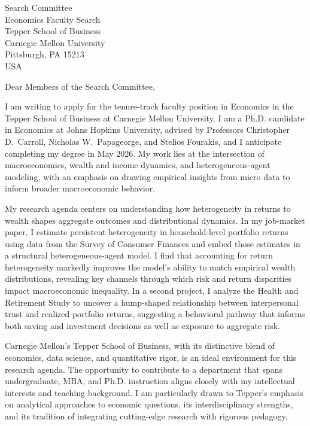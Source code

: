 \documentclass[11pt,letterpaper]{letter}
\begin{document}
\begin{letter}{Search Committee \\
Economics Faculty Search \\
Tepper School of Business \\
Carnegie Mellon University \\
Pittsburgh, PA 15213 \\ USA}

\opening{Dear Members of the Search Committee,}

I am writing to apply for the tenure-track faculty position in Economics in the Tepper School of Business at Carnegie Mellon University. I am a Ph.D. candidate in Economics at Johns Hopkins University, advised by Professors Christopher D.~Carroll, Nicholas W.~Papageorge, and Stelios Fourakis, and I anticipate completing my degree in May 2026. My work lies at the intersection of macroeconomics, wealth and income dynamics, and heterogeneous-agent modeling, with an emphasis on drawing empirical insights from micro data to inform broader macroeconomic behavior.

My research agenda centers on understanding how heterogeneity in returns to wealth shapes aggregate outcomes and distributional dynamics. In my job-market paper, I estimate persistent heterogeneity in household-level portfolio returns using data from the Survey of Consumer Finances and embed those estimates in a structural heterogeneous-agent model. I find that accounting for return heterogeneity markedly improves the model’s ability to match empirical wealth distributions, revealing key channels through which risk and return disparities impact macroeconomic inequality. In a second project, I analyze the Health and Retirement Study to uncover a hump-shaped relationship between interpersonal trust and realized portfolio returns, suggesting a behavioral pathway that informs both saving and investment decisions as well as exposure to aggregate risk.

Carnegie Mellon’s Tepper School of Business, with its distinctive blend of economics, data science, and quantitative rigor, is an ideal environment for this research agenda. The opportunity to contribute to a department that spans undergraduate, MBA, and Ph.D. instruction aligns closely with my intellectual interests and teaching background. I am particularly drawn to Tepper’s emphasis on analytical approaches to economic questions, its interdisciplinary strengths, and its tradition of integrating cutting-edge research with rigorous pedagogy.


\end{letter}
\end{document}
